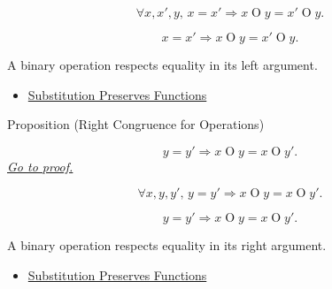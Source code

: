 \begin{remark*}
\[
\forall x,x',y,\,
x=x' \Longrightarrow x\mathbin{O}y=x'\mathbin{O}y.
\]
\end{remark*}

\begin{remark*}
\[
x=x' \Longrightarrow x\mathbin{O}y=x'\mathbin{O}y.
\]
\end{remark*}

\begin{remark*}[Interpretation]
A binary operation respects equality in its left argument.
\end{remark*}

\begin{dependencies}
\begin{itemize}
  \item \hyperref[prop:substitution-preserves-functions]{Substitution Preserves Functions}
\end{itemize}
\end{dependencies}

\begin{propositionbox}{Proposition (Right Congruence for Operations)}
\begin{proposition}
\label{prop:substitution-preserves-operations-right}
\[
y=y' \Longrightarrow x\mathbin{O}y=x\mathbin{O}y'.
\]
\hyperref[prf:substitution-preserves-operations-right]{\textit{Go to proof.}}
\end{proposition}
\end{propositionbox}

\begin{remark*}
\[
\forall x,y,y',\,
y=y' \Longrightarrow x\mathbin{O}y=x\mathbin{O}y'.
\]
\end{remark*}

\begin{remark*}
\[
y=y' \Longrightarrow x\mathbin{O}y=x\mathbin{O}y'.
\]
\end{remark*}

\begin{remark*}[Interpretation]
A binary operation respects equality in its right argument.
\end{remark*}

\begin{dependencies}
\begin{itemize}
  \item \hyperref[prop:substitution-preserves-functions]{Substitution Preserves Functions}
\end{itemize}
\end{dependencies}

